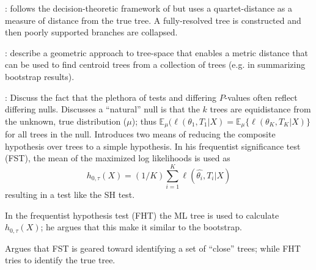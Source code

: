 \documentclass[11pt]{article}
\newcommand{\like}{\ell}
\newcommand{\expectation}{{\mathbb{E}}}
\newcommand{\pvalues}{$P$-values\xspace}
\begin{document}
\citet{BerryGC2000}: follows the decision-theoretic framework of \citet{BerryG1996} but uses a quartet-distance as a measure of distance from the true tree. A fully-resolved tree is constructed and then poorly supported branches are collapsed.

\citet{BilleraHV2001}: describe a geometric approach to tree-space that enables a metric distance that can be used to find centroid trees from a collection of trees (e.g. in summarizing bootstrap results).

\citet{ArisBrosou2003}: Discuss the fact that the plethora of tests and differing \pvalues often reflect differing nulls.  Discusses a ``natural'' null is that the $k$ trees are equidistance from the unknown, true distribution ($\mu$); thus $\expectation_{\mu}(\like(\theta_1,T_1|X) = \expectation_{\mu}\{\like(\theta_K,T_K|X)\}$ for all trees in the null.  Introduces two means of reducing the composite hypothesis over trees to a simple hypothesis.
In his frequentist significance test (FST), the mean of the maximized log likelihoods is used as $$h_{0,\tau}(X) = (1/K)\sum_{i=1}^K \like(\hat{\theta_i},T_i|X)$$
resulting in a test like the SH test.

In the frequentist hypothesis test (FHT) the ML tree is used to calculate $h_{0,\tau}(X)$; he argues that this make it similar to the bootstrap.

Argues that FST is geared toward identifying a set of ``close'' trees; while FHT tries to identify the true tree.
\end{document}
